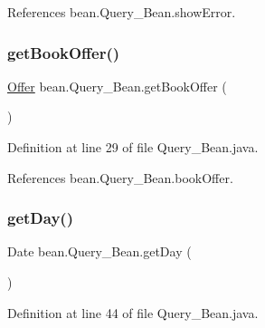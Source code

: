 References bean.\+Query\+\_\+\+Bean.\+show\+Error.

\mbox{\label{classbean_1_1Query__Bean_a24e8cd9b440666b540a2272d5df12e24}} 
\subsubsection{\texorpdfstring{getBookOffer()}{getBookOffer()}}
{\footnotesize\ttfamily \mbox{\hyperlink{classdomain_1_1Offer}{Offer}} bean.\+Query\+\_\+\+Bean.\+get\+Book\+Offer (\begin{DoxyParamCaption}{ }\end{DoxyParamCaption})}



Definition at line 29 of file Query\+\_\+\+Bean.\+java.


\begin{DoxyCode}{0}

\end{DoxyCode}


References bean.\+Query\+\_\+\+Bean.\+book\+Offer.

\mbox{\label{classbean_1_1Query__Bean_a34d5b9a6d575a9270079c5376822bd00}} 
\subsubsection{\texorpdfstring{getDay()}{getDay()}}
{\footnotesize\ttfamily Date bean.\+Query\+\_\+\+Bean.\+get\+Day (\begin{DoxyParamCaption}{ }\end{DoxyParamCaption})}



Definition at line 44 of file Query\+\_\+\+Bean.\+java.


\begin{DoxyCode}{0}

\end{DoxyCode}


